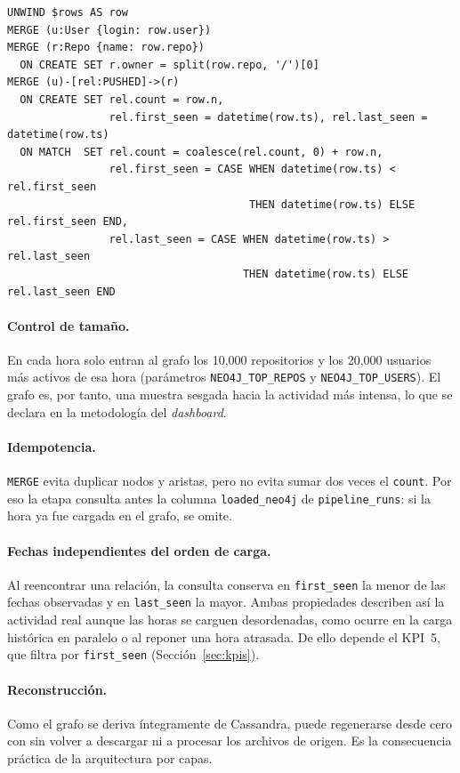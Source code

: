 \begin{lstlisting}[style=plano]
UNWIND $rows AS row
MERGE (u:User {login: row.user})
MERGE (r:Repo {name: row.repo})
  ON CREATE SET r.owner = split(row.repo, '/')[0]
MERGE (u)-[rel:PUSHED]->(r)
  ON CREATE SET rel.count = row.n,
                rel.first_seen = datetime(row.ts), rel.last_seen = datetime(row.ts)
  ON MATCH  SET rel.count = coalesce(rel.count, 0) + row.n,
                rel.first_seen = CASE WHEN datetime(row.ts) < rel.first_seen
                                      THEN datetime(row.ts) ELSE rel.first_seen END,
                rel.last_seen = CASE WHEN datetime(row.ts) > rel.last_seen
                                     THEN datetime(row.ts) ELSE rel.last_seen END
\end{lstlisting}

\paragraph{Control de tamaño.} En cada hora solo entran al grafo los 10,000 repositorios y los 20,000 usuarios más activos de esa hora (parámetros \texttt{NEO4J\_TOP\_REPOS} y \texttt{NEO4J\_TOP\_USERS}). El grafo es, por tanto, una muestra sesgada hacia la actividad más intensa, lo que se declara en la metodología del \textit{dashboard}.

\paragraph{Idempotencia.} \texttt{MERGE} evita duplicar nodos y aristas, pero no evita sumar dos veces el \texttt{count}. Por eso la etapa consulta antes la columna \texttt{loaded\_neo4j} de \texttt{pipeline\_runs}: si la hora ya fue cargada en el grafo, se omite.

\paragraph{Fechas independientes del orden de carga.} Al reencontrar una relación, la consulta conserva en \texttt{first\_seen} la menor de las fechas observadas y en \texttt{last\_seen} la mayor. Ambas propiedades describen así la actividad real aunque las horas se carguen desordenadas, como ocurre en la carga histórica en paralelo o al reponer una hora atrasada. De ello depende el KPI~5, que filtra por \texttt{first\_seen} (Sección~\ref{sec:kpis}).

\paragraph{Reconstrucción.} Como el grafo se deriva íntegramente de Cassandra, puede regenerarse desde cero con  sin volver a descargar ni a procesar los archivos de origen. Es la consecuencia práctica de la arquitectura por capas.

